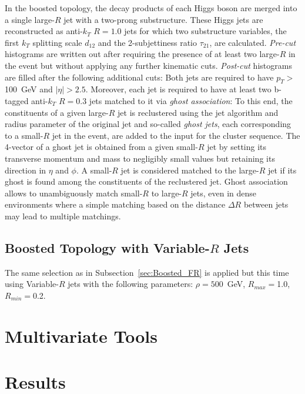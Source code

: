 \documentclass[12pt]{article}
\begin{document}
In the boosted topology, the decay products of each Higgs boson are merged into a single large-$R$ jet with a two-prong substructure. 
These Higgs jets are reconstructed as anti-$k_T$ $R=1.0$ jets for which two substructure variables, the first $k_T$ splitting scale $d_{12}$
and the 2-subjettiness ratio $\tau_{21}$, are calculated.
\textit{Pre-cut} histograms are written out after requiring the presence of at least two large-$R$ in the event but without applying any further
kinematic cuts. \textit{Post-cut} histograms are filled after the following additional cuts: 
Both jets are required to have $p_T >$100~GeV and $|\eta|>2.5$. Moreover, each jet is required to have at least two b-tagged anti-$k_T$ $R=0.3$ 
jets matched to it via \textit{ghost association}: 
To this end, the constituents of a given large-$R$ jet is reclustered using the jet algorithm 
and radius parameter of the original jet and so-called \textit{ghost jets}, each corresponding to a small-$R$ jet in the event, 
are added to the input for the cluster sequence. The 4-vector of a ghost jet is obtained from a given small-$R$ jet 
by setting its transverse momentum and mass to negligibly small values but retaining its direction in $\eta$ and $\phi$. A small-$R$ jet is 
considered matched to the large-$R$ jet if its ghost is found among the constituents of the reclustered jet. Ghost association allows to unambiguously
match small-$R$ to large-$R$ jets, even in dense environments where a simple matching based on the distance $\Delta R$ between jets 
may lead to multiple matchings.

\subsection{Boosted Topology with Variable-$R$ Jets}

The same selection as in Subsection~\ref{sec:Boosted_FR} is applied but this time using Variable-$R$ jets with the following parameters:
$\rho=500$~GeV, $R_{max}=$1.0, $R_{min}=$0.2.

\section{Multivariate Tools}

\clearpage
\section{Results}
\end{document}

